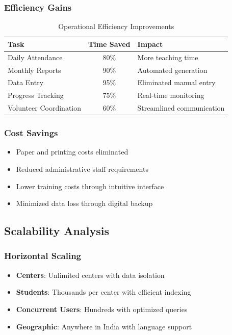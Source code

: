 \documentclass[12pt,a4paper]{article}
\begin{document}
\subsubsection{Efficiency Gains}
\begin{table}[H]
\centering
\small
\begin{tabularx}{\textwidth}{|l|c|X|}
\hline
\rowcolor{lightgray}
\textbf{Task} & \textbf{Time Saved} & \textbf{Impact} \\
\hline
Daily Attendance & 80\% & More teaching time \\
\hline
Monthly Reports & 90\% & Automated generation \\
\hline
Data Entry & 95\% & Eliminated manual entry \\
\hline
Progress Tracking & 75\% & Real-time monitoring \\
\hline
Volunteer Coordination & 60\% & Streamlined communication \\
\hline
\end{tabularx}
\caption{Operational Efficiency Improvements}
\end{table}

\subsubsection{Cost Savings}
\begin{itemize}[leftmargin=*, itemsep=0.2em]
    \item Paper and printing costs eliminated
    \item Reduced administrative staff requirements
    \item Lower training costs through intuitive interface
    \item Minimized data loss through digital backup
\end{itemize}

\subsection{Scalability Analysis}

\subsubsection{Horizontal Scaling}
\begin{itemize}[leftmargin=*, itemsep=0.2em]
    \item \textbf{Centers}: Unlimited centers with data isolation
    \item \textbf{Students}: Thousands per center with efficient indexing
    \item \textbf{Concurrent Users}: Hundreds with optimized queries
    \item \textbf{Geographic}: Anywhere in India with language support
\end{itemize}
\end{document}

